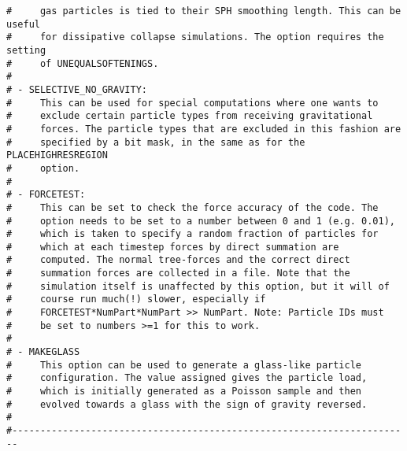 \documentclass[a4paper,english,10.5pt]{scrartcl}
\begin{document}
\begin{verbatim}
#     gas particles is tied to their SPH smoothing length. This can be useful
#     for dissipative collapse simulations. The option requires the setting
#     of UNEQUALSOFTENINGS.
#
# - SELECTIVE_NO_GRAVITY:
#     This can be used for special computations where one wants to 
#     exclude certain particle types from receiving gravitational
#     forces. The particle types that are excluded in this fashion are 
#     specified by a bit mask, in the same as for the PLACEHIGHRESREGION 
#     option.
#
# - FORCETEST:       
#     This can be set to check the force accuracy of the code. The
#     option needs to be set to a number between 0 and 1 (e.g. 0.01),
#     which is taken to specify a random fraction of particles for
#     which at each timestep forces by direct summation are
#     computed. The normal tree-forces and the correct direct
#     summation forces are collected in a file. Note that the
#     simulation itself is unaffected by this option, but it will of
#     course run much(!) slower, especially if 
#     FORCETEST*NumPart*NumPart >> NumPart. Note: Particle IDs must 
#     be set to numbers >=1 for this to work.
#
# - MAKEGLASS
#     This option can be used to generate a glass-like particle 
#     configuration. The value assigned gives the particle load,
#     which is initially generated as a Poisson sample and then
#     evolved towards a glass with the sign of gravity reversed.
#
#-----------------------------------------------------------------------


\end{verbatim}
\end{document}
